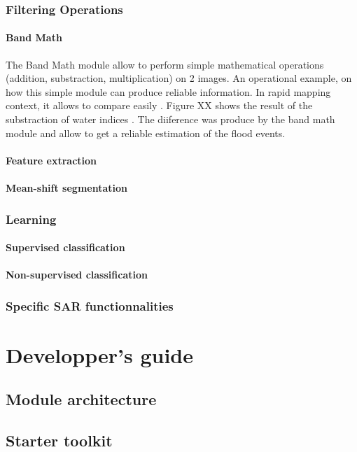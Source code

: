 \documentclass{InsightSoftwareGuide}
\begin{document}
\section{Filtering Operations}
\subsection{Band Math}
The Band Math module allow to perform simple mathematical operations (addition, substraction, multiplication) on 2 images. 
An operational example, on how this simple module can produce reliable information.
In rapid mapping context, it allows to compare easily . Figure XX shows the result of the substraction of water indices . The diiference was produce by the band math module
and allow to get a reliable estimation of the flood events.
\subsection{Feature extraction}
\subsection{Mean-shift segmentation}
\section{Learning}
\subsection{Supervised classification}
\subsection{Non-supervised classification}
\section{Specific SAR functionnalities}



\part{Developper's guide}\label{part:developperguide}
\chapter{Module architecture}
\chapter{Starter toolkit}
\end{document}
